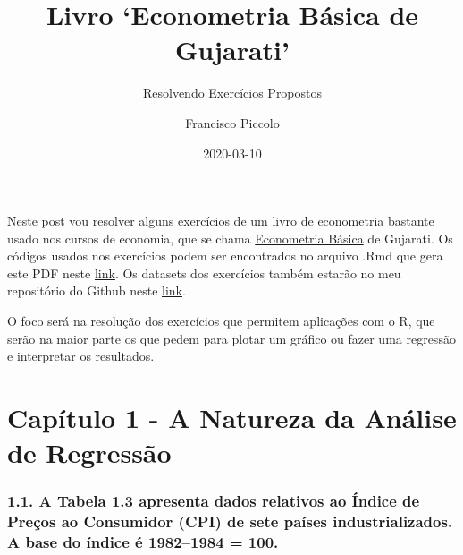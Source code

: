 \documentclass[
  11pt,
  a4paper,
]{article}
\title{Livro `Econometria Básica de Gujarati'}
\subtitle{Resolvendo Exercícios Propostos}
\author{Francisco Piccolo}
\date{2020-03-10}
\begin{document}
\maketitle

Neste post vou resolver alguns exercícios de um livro de econometria bastante usado nos cursos de economia, que se chama \href{https://www.amazon.com.br/Econometria-B\%C3\%A1sica-Damodar-N-Gujarati/dp/8563308327/ref=sr_1_1?__mk_pt_BR=\%C3\%85M\%C3\%85\%C5\%BD\%C3\%95\%C3\%91\&dchild=1\&keywords=econometria+b\%C3\%A1sica+gujarati\&qid=1624149011\&sr=8-1}{Econometria Básica} de Gujarati. Os códigos usados nos exercícios podem ser encontrados no arquivo .Rmd que gera este PDF neste \href{https://github.com/FranciscoPiccolo/franciscopiccolo.github.io/blob/master/02.solving_exercises_from_gujarati's_book_basic_econometrics_20200301/article.Rmd}{link}. Os datasets dos exercícios também estarão no meu repositório do Github neste \href{https://github.com/FranciscoPiccolo/franciscopiccolo.github.io/tree/master/02.solving_exercises_from_gujarati's_book_basic_econometrics_20200301/datasets}{link}.

O foco será na resolução dos exercícios que permitem aplicações com o R, que serão na maior parte os que pedem para plotar um gráfico ou fazer uma regressão e interpretar os resultados.

\hypertarget{capuxedtulo-1---a-natureza-da-anuxe1lise-de-regressuxe3o}{%
\section{Capítulo 1 - A Natureza da Análise de Regressão}\label{capuxedtulo-1---a-natureza-da-anuxe1lise-de-regressuxe3o}}

\hypertarget{a-tabela-1.3-apresenta-dados-relativos-ao-uxedndice-de-preuxe7os-ao-consumidor-cpi-de-sete-pauxedses-industrializados.-a-base-do-uxedndice-uxe9-19821984-100.}{%
\subsubsection{1.1. A Tabela 1.3 apresenta dados relativos ao Índice de Preços ao Consumidor (CPI) de sete países industrializados. A base do índice é 1982--1984 = 100.}\label{a-tabela-1.3-apresenta-dados-relativos-ao-uxedndice-de-preuxe7os-ao-consumidor-cpi-de-sete-pauxedses-industrializados.-a-base-do-uxedndice-uxe9-19821984-100.}}
\end{document}

